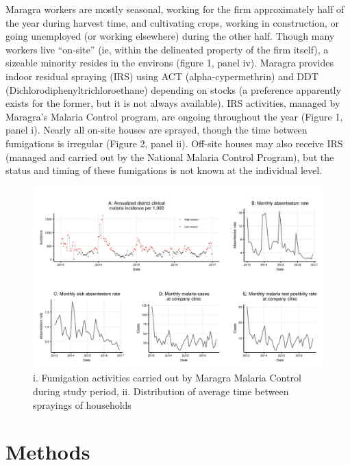 \documentclass[]{article}
\begin{document}
Maragra workers are mostly seasonal, working for the firm approximately
half of the year during harvest time, and cultivating crops, working in
construction, or going unemployed (or working elsewhere) during the
other half. Though many workers live ``on-site'' (ie, within the
delineated property of the firm itself), a sizeable minority resides in
the environs (figure 1, panel iv). Maragra provides indoor residual
spraying (IRS) using ACT (alpha-cypermethrin) and DDT
(Dichlorodiphenyltrichloroethane) depending on stocks (a preference
apparently exists for the former, but it is not always available). IRS
activities, managed by Maragra's Malaria Control program, are ongoing
throughout the year (Figure 1, panel i). Nearly all on-site houses are
sprayed, though the time between fumigations is irregular (Figure 2,
panel ii). Off-site houses may also receive IRS (managed and carried out
by the National Malaria Control Program), but the status and timing of
these fumigations is not known at the individual level.

\begin{figure}[h]

{\centering \includegraphics{figures/unnamed-chunk-15-1} 

}

\caption{i. Fumigation activities carried out by Maragra Malaria Control during study period, ii. Distribution of average time between sprayings of households}\label{fig:unnamed-chunk-15}
\end{figure}

\section{Methods}\label{methods}
\end{document}
